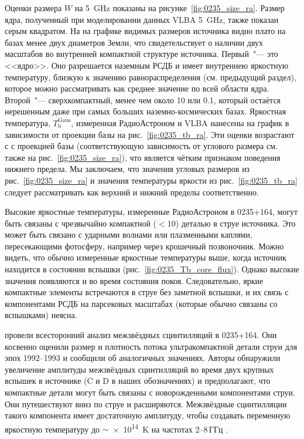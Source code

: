 Оценки размера $W$ на \SI{5}{\GHz} показаны на рисунке~\ref{fig:0235_size_ra}. Размер ядра,
полученный при моделировании данных VLBA \SI{5}{\GHz}, также показан серым квадратом. На на графике
видимых размеров источника видно плато на базах менее двух диаметров Земли, что свидетельствует о
наличии двух масштабов во внутренней компактной структуре источника. Первый~"--- это <<ядро>>. Оно
разрешается наземным РСДБ и имеет внутреннею яркостную температуру, близкую к значению
равнораспределения (см. предыдущий раздел), которое можно рассматривать как среднее значение по
всей области ядра. Второй~"--- сверхкомпактный, менее чем около \SI{10}{\uas} или
\SI{0.1}{\parsec}, который остаётся нерешенным даже при самых больших наземно-космических базах.
Яркостная температура, $T_\text{b}^\text{Gaus}$, измеренная РадиоАстроном и VLBA нанесены на график
в зависимости от проекции базы на рис.~\ref{fig:0235_tb_ra}. Эти оценки возрастают с с проекцией
базы (соответствующую зависимость от углового размера см. также на рис.~\ref{fig:0235_size_ra}),
что является чётким признаком поведения нижнего предела. Мы заключаем, что значения угловых
размеров из рис.~\ref{fig:0235_size_ra} и значения температуры яркости из рис.~\ref{fig:0235_tb_ra}
следует рассматривать как верхний и нижний пределы соответственно.

Высокие яркостные температуры, измеренные РадиоАстроном в 0235+164, могут быть связаны с
чрезвычайно компактной ($<$\SI{10}{\uas}) деталью в струе источника. Это может быть связано
с ударными волнами или плазменными каплями, пересекающими фотосферу, например через крошечный
позвоночник. Можно видеть, что обычно измеренные яркостные температуры выше, когда источник
находится в состоянии вспышки (рис.~\ref{fig:0235_Tb_core_flux}). Однако высокие значения появляются
и во время состояния покоя. Следовательно, яркие компактные элементы встречаются в струе без
заметной вспышки, и их связь с компонентами РСДБ на парсековых масштабах (которые обычно связаны со
вспышками) неясна.

\cite{Rickett_2006} провели всесторонний анализ межзвёздных сцинтилляций в 0235+164. Они косвенно
оценили размер и плотность потока ультракомпактной детали струи для эпох 1992--1993 и сообщили об
аналогичных значениях. Авторы обнаружили увеличение амплитуды межзвёздных сцинтилляций во время двух
крупных вспышек в источнике (C и D в наших обозначениях) и предполагают, что компактные детали могут
быть связаны с новорожденными компонентами струи. Они путешествуют вниз по струе и расширяются.
Межзвёздные сцинтилляции такого компонента имеет достаточную амплитуду, чтобы создавать переменную
яркостную температуру до $\sim$\SI{e14}{\kelvin} на частотах 2--8\,ГГц \cite{Rickett_2006}.


